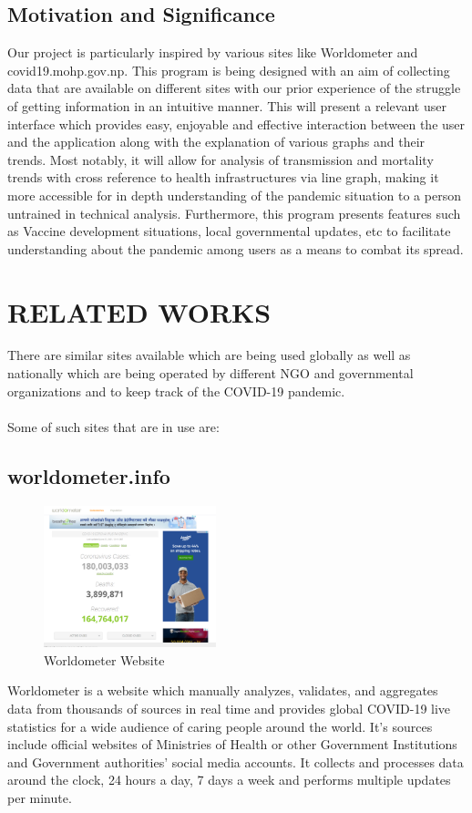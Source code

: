 \documentclass{article}
\begin{document}
\vspace*{5mm}
\subsection{Motivation and Significance}
Our project is particularly inspired by various sites like Worldometer and covid19.mohp.gov.np. This program is being designed with an aim of collecting data that 
are available on different sites with our prior experience of the struggle of getting information in an intuitive manner. This will present a relevant user interface 
which provides easy, enjoyable and effective interaction between the user and the application along with the explanation of various graphs and their trends. Most 
notably, it will allow for analysis of transmission and mortality trends with cross reference to health infrastructures via line graph, making it more accessible 
for in depth understanding of the pandemic situation to a person untrained in technical analysis. Furthermore, this program presents features such as Vaccine 
development situations, local governmental updates, etc to facilitate understanding about the pandemic among users as a means to combat its spread.

\clearpage

\section{RELATED WORKS}
There are similar sites available which are being used globally as well as nationally which are being operated by different NGO and governmental organizations and 
to keep track of the COVID-19 pandemic.
\\\\
Some of such sites that are in use are:

\subsection{worldometer.info}
\begin{figure}[h]
    \centerline{\includegraphics[width = 50mm]{worldometer.png}}
    \caption{Worldometer Website}
    \label{fig}
\end{figure}
Worldometer is a website which manually analyzes, validates, and aggregates data from thousands of sources in real time and provides global COVID-19 live statistics for a wide audience of caring people around the world. It's sources include official websites of Ministries of Health or other Government Institutions and Government authorities' social media accounts. It collects and processes data around the clock, 24 hours a day, 7 days a week and performs multiple updates per minute. 
\end{document}
